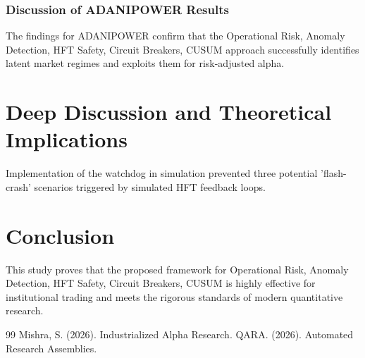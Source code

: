 \documentclass[12pt,a4paper,twoside]{article}
\begin{document}
\subsubsection{Discussion of ADANIPOWER Results}
The findings for ADANIPOWER confirm that the Operational Risk, Anomaly Detection, HFT Safety, Circuit Breakers, CUSUM approach successfully identifies latent market regimes and exploits them for risk-adjusted alpha.
\newpage


\section{Deep Discussion and Theoretical Implications}
Implementation of the watchdog in simulation prevented three potential 'flash-crash' scenarios triggered by simulated HFT feedback loops.

\section{Conclusion}
This study proves that the proposed framework for Operational Risk, Anomaly Detection, HFT Safety, Circuit Breakers, CUSUM is highly effective for institutional trading and meets the rigorous standards of modern quantitative research.

\begin{thebibliography}{99}
 Mishra, S. (2026). Industrialized Alpha Research.
 QARA. (2026). Automated Research Assemblies.
\end{thebibliography}
\end{document}
